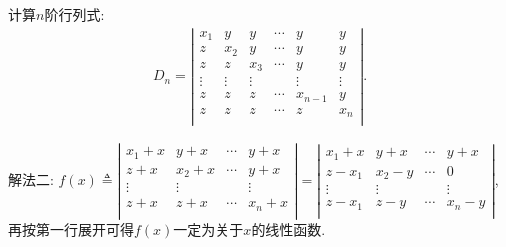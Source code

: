 \documentclass[../../main.tex]{subfiles}%
\begin{document}
\begin{proposition}\label{proposition:小拆分法经典例题}
计算$n$阶行列式:
\begin{align*}
D_n=\left| \begin{matrix}
x_1&		y&		y&		\cdots&		y&		y\\
z&		x_2&		y&		\cdots&		y&		y\\
z&		z&		x_3&		\cdots&		y&		y\\
\vdots&		\vdots&		\vdots&		&		\vdots&		\vdots\\
z&		z&		z&		\cdots&		x_{n-1}&		y\\
z&		z&		z&		\cdots&		z&		x_n\\
\end{matrix} \right|.
\end{align*}
\end{proposition}
\begin{note}
{\color{blue}解法二:}
$f(x) \triangleq \left| \begin{matrix}
x_1+x & y+x & \cdots & y+x \\
z+x & x_2+x & \cdots & y+x \\ 
\vdots & \vdots & & \vdots \\
z+x & z+x & \cdots & x_n+x \\
\end{matrix} \right|=\left| \begin{matrix}
x_1+x & y+x & \cdots & y+x \\
z-x_1 & x_2-y & \cdots & 0 \\
\vdots & \vdots & & \vdots \\
z-x_1 & z-y & \cdots & x_n-y \\
\end{matrix} \right|$,再按第一行展开可得$f(x)$一定为关于$x$的线性函数.
\end{note}
\end{document}
